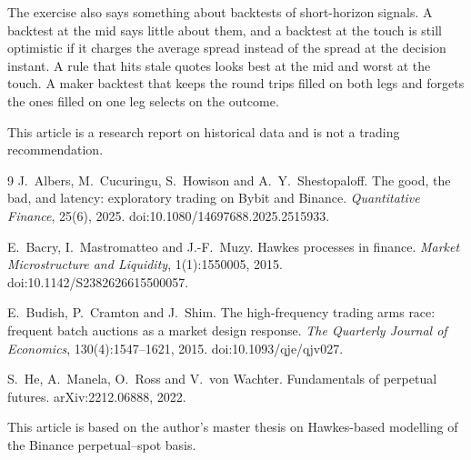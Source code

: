 \documentclass[a4paper,11pt]{article}
\begin{document}
The exercise also says something about backtests of short-horizon signals. A backtest at the mid says little about them, and a backtest at the touch is still optimistic if it charges the average spread instead of the spread at the decision instant. A rule that hits stale quotes looks best at the mid and worst at the touch. A maker backtest that keeps the round trips filled on both legs and forgets the ones filled on one leg selects on the outcome.

This article is a research report on historical data and is not a trading recommendation.

\begin{thebibliography}{9}
J.~Albers, M.~Cucuringu, S.~Howison and A.~Y.~Shestopaloff.
\newblock The good, the bad, and latency: exploratory trading on Bybit and Binance.
\newblock \emph{Quantitative Finance}, 25(6), 2025.
\newblock doi:10.1080/14697688.2025.2515933.

E.~Bacry, I.~Mastromatteo and J.-F.~Muzy.
\newblock Hawkes processes in finance.
\newblock \emph{Market Microstructure and Liquidity}, 1(1):1550005, 2015.
\newblock doi:10.1142/S2382626615500057.

E.~Budish, P.~Cramton and J.~Shim.
\newblock The high-frequency trading arms race: frequent batch auctions as a market design response.
\newblock \emph{The Quarterly Journal of Economics}, 130(4):1547--1621, 2015.
\newblock doi:10.1093/qje/qjv027.

S.~He, A.~Manela, O.~Ross and V.~von Wachter.
\newblock Fundamentals of perpetual futures.
\newblock arXiv:2212.06888, 2022.
\end{thebibliography}

\bigskip
\noindent\small This article is based on the author's master thesis on Hawkes-based modelling of the Binance perpetual--spot basis.
\end{document}

